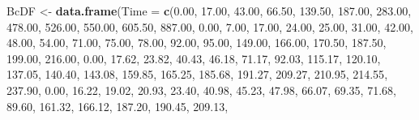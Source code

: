 \documentclass[]{book}
\newenvironment{Shaded}{\begin{snugshade}}{\end{snugshade}}
\newcommand{\KeywordTok}[1]{\textcolor[rgb]{0.13,0.29,0.53}{\textbf{#1}}}
\newcommand{\DataTypeTok}[1]{\textcolor[rgb]{0.13,0.29,0.53}{#1}}
\newcommand{\FloatTok}[1]{\textcolor[rgb]{0.00,0.00,0.81}{#1}}
\newcommand{\StringTok}[1]{\textcolor[rgb]{0.31,0.60,0.02}{#1}}
\newcommand{\NormalTok}[1]{#1}
\theoremstyle{definition}
\theoremstyle{definition}
\theoremstyle{definition}
\theoremstyle{remark}
\begin{document}
\begin{Shaded}
\begin{Highlighting}[]
\NormalTok{BcDF <-}\StringTok{ }\KeywordTok{data.frame}\NormalTok{(}\DataTypeTok{Time =} \KeywordTok{c}\NormalTok{(}\FloatTok{0.00}\NormalTok{, }\FloatTok{17.00}\NormalTok{, }\FloatTok{43.00}\NormalTok{, }\FloatTok{66.50}\NormalTok{, }\FloatTok{139.50}\NormalTok{, }\FloatTok{187.00}\NormalTok{, }\FloatTok{283.00}\NormalTok{,}
                            \FloatTok{478.00}\NormalTok{, }\FloatTok{526.00}\NormalTok{, }\FloatTok{550.00}\NormalTok{, }\FloatTok{605.50}\NormalTok{, }\FloatTok{887.00}\NormalTok{,}
                            \FloatTok{0.00}\NormalTok{, }\FloatTok{7.00}\NormalTok{, }\FloatTok{17.00}\NormalTok{, }\FloatTok{24.00}\NormalTok{, }\FloatTok{25.00}\NormalTok{, }\FloatTok{31.00}\NormalTok{, }\FloatTok{42.00}\NormalTok{,}
                            \FloatTok{48.00}\NormalTok{, }\FloatTok{54.00}\NormalTok{, }\FloatTok{71.00}\NormalTok{, }\FloatTok{75.00}\NormalTok{, }\FloatTok{78.00}\NormalTok{, }\FloatTok{92.00}\NormalTok{, }\FloatTok{95.00}\NormalTok{,}
                            \FloatTok{149.00}\NormalTok{, }\FloatTok{166.00}\NormalTok{, }\FloatTok{170.50}\NormalTok{, }\FloatTok{187.50}\NormalTok{, }\FloatTok{199.00}\NormalTok{, }\FloatTok{216.00}\NormalTok{,}
                            \FloatTok{0.00}\NormalTok{, }\FloatTok{17.62}\NormalTok{, }\FloatTok{23.82}\NormalTok{, }\FloatTok{40.43}\NormalTok{, }\FloatTok{46.18}\NormalTok{, }\FloatTok{71.17}\NormalTok{, }\FloatTok{92.03}\NormalTok{,}
                            \FloatTok{115.17}\NormalTok{, }\FloatTok{120.10}\NormalTok{, }\FloatTok{137.05}\NormalTok{, }\FloatTok{140.40}\NormalTok{, }\FloatTok{143.08}\NormalTok{, }\FloatTok{159.85}\NormalTok{,}
                            \FloatTok{165.25}\NormalTok{, }\FloatTok{185.68}\NormalTok{, }\FloatTok{191.27}\NormalTok{, }\FloatTok{209.27}\NormalTok{, }\FloatTok{210.95}\NormalTok{, }\FloatTok{214.55}\NormalTok{,}
                            \FloatTok{237.90}\NormalTok{,}
                            \FloatTok{0.00}\NormalTok{, }\FloatTok{16.22}\NormalTok{, }\FloatTok{19.02}\NormalTok{, }\FloatTok{20.93}\NormalTok{, }\FloatTok{23.40}\NormalTok{, }\FloatTok{40.98}\NormalTok{, }\FloatTok{45.23}\NormalTok{,}
                            \FloatTok{47.98}\NormalTok{, }\FloatTok{66.07}\NormalTok{, }\FloatTok{69.35}\NormalTok{, }\FloatTok{71.68}\NormalTok{, }\FloatTok{89.60}\NormalTok{, }\FloatTok{161.32}\NormalTok{, }\FloatTok{166.12}\NormalTok{,}
                            \FloatTok{187.20}\NormalTok{, }\FloatTok{190.45}\NormalTok{, }\FloatTok{209.13}\NormalTok{,}

\end{Highlighting}
\end{Shaded}
\end{document}
